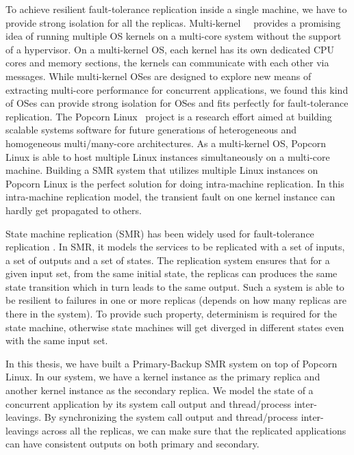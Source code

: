 To achieve resilient fault-tolerance replication inside a single machine, we have to provide strong isolation for all the replicas. Multi-kernel~\cite{baumann2009multikernel}~\cite{barbalace2014popcorn} provides a promising idea of running multiple OS kernels on a multi-core system without the support of a hypervisor. On a multi-kernel OS, each kernel has its own dedicated CPU cores and memory sections, the kernels can communicate with each other via messages. While multi-kernel OSes are designed to explore new means of extracting multi-core performance for concurrent applications, we found this kind of OSes can provide strong isolation for OSes and fits perfectly for fault-tolerance replication. The Popcorn Linux~\cite{barbalace2014popcorn} project is a research effort aimed at building scalable systems software for future generations of heterogeneous and homogeneous multi/many-core architectures. As a multi-kernel OS, Popcorn Linux is able to host multiple Linux instances simultaneously on a multi-core machine. Building a SMR system that utilizes multiple Linux instances on Popcorn Linux is the perfect solution for doing intra-machine replication. In this intra-machine replication model, the transient fault on one kernel instance can hardly get propagated to others.

State machine replication (SMR) has been widely used for fault-tolerance replication . In SMR, it models the services to be replicated with a set of inputs, a set of outputs and a set of states. The replication system ensures that for a given input set, from the same initial state, the replicas can produces the same state transition which in turn leads to the same output. Such a system is able to be resilient to failures in one or more replicas (depends on how many replicas are there in the system). To provide such property, determinism is required for the state machine, otherwise state machines will get diverged in different states even with the same input set.

In this thesis, we have built a Primary-Backup SMR system on top of Popcorn Linux. In our system, we have a kernel instance as the primary replica and another kernel instance as the secondary replica. We model the state of a concurrent application by its system call output and thread/process inter-leavings. By synchronizing the system call output and thread/process inter-leavings across all the replicas, we can make sure that the replicated applications can have consistent outputs on both primary and secondary.

